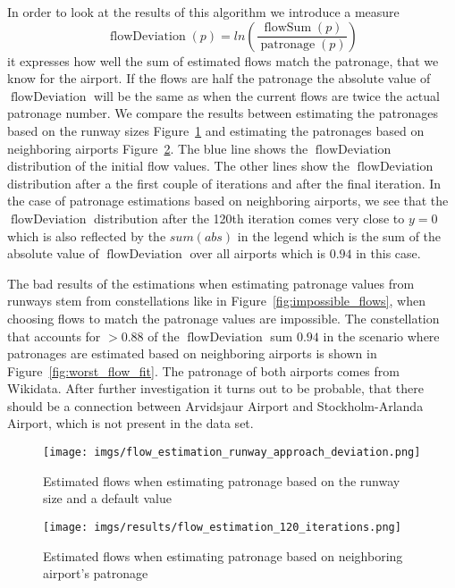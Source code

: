 \documentclass[twocolumn]{tum-article}
\DeclareMathOperator{\patronage}{patronage}
\DeclareMathOperator{\flowSum}{flowSum}
\DeclareMathOperator{\flowDeviation}{flowDeviation}
\begin{document}
In order to look at the results of this algorithm we introduce a measure 
\begin{equation}
\flowDeviation(p) = ln\left(\dfrac{\flowSum(p)}{\patronage(p)}\right)
\end{equation}
it expresses how well the sum of estimated flows match the patronage, that we know for the airport. If the flows are half the patronage the absolute value of $\flowDeviation$ will be the same as when the current flows are twice the actual patronage number. 
We compare the results between estimating the patronages based on the runway sizes Figure~\ref{fig:flow_deviation_runway} and estimating the patronages based on neighboring airports Figure~\ref{fig:flow_deviation}. 
The blue line shows the $\flowDeviation$ distribution of the initial flow values.
The other lines show the $\flowDeviation$ distribution after a the first couple of iterations and after the final iteration. 
In the case of patronage estimations based on neighboring airports, we see that the $\flowDeviation$ distribution after the 120th iteration comes very close to $y=0$ which is also reflected by the $sum(abs)$ in the legend which is the sum of the absolute value of $\flowDeviation$ over all airports which is $0.94$ in this case.

The bad results of the estimations when estimating patronage values from runways stem from constellations like in Figure~\ref{fig:impossible_flows}, when choosing flows to match the patronage values are impossible. 
The constellation that accounts for $>0.88$ of the $\flowDeviation$ sum $0.94$ in the scenario where patronages are estimated based on neighboring airports is shown in Figure~\ref{fig:worst_flow_fit}. 
The patronage of both airports comes from Wikidata. After further investigation it turns out to be probable, that there should be a connection between Arvidsjaur Airport and Stockholm-Arlanda Airport, which is not present in the data set. 

\begin{figure}[h]
	\centering
	\texttt{[image: imgs/flow\_estimation\_runway\_approach\_deviation.png]}
	\caption{
Estimated flows when estimating patronage based on the runway size and a default value}
	\label{fig:flow_deviation_runway}
\end{figure}

\begin{figure}[h]
	\centering
	\texttt{[image: imgs/results/flow\_estimation\_120\_iterations.png]}
	\caption{
Estimated flows when estimating patronage based on neighboring airport's patronage}
	\label{fig:flow_deviation}
\end{figure}
\end{document}
